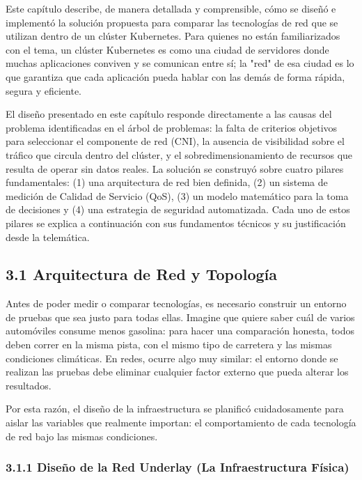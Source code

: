 \documentclass[journal]{IEEEtran}
\begin{document}
Este capítulo describe, de manera detallada y comprensible, cómo se diseñó e implementó la solución propuesta para comparar las tecnologías de red que se utilizan dentro de un clúster Kubernetes. Para quienes no están familiarizados con el tema, un clúster Kubernetes es como una ciudad de servidores donde muchas aplicaciones conviven y se comunican entre sí; la "red" de esa ciudad es lo que garantiza que cada aplicación pueda hablar con las demás de forma rápida, segura y eficiente.

El diseño presentado en este capítulo responde directamente a las causas del problema identificadas en el árbol de problemas: la falta de criterios objetivos para seleccionar el componente de red (CNI), la ausencia de visibilidad sobre el tráfico que circula dentro del clúster, y el sobredimensionamiento de recursos que resulta de operar sin datos reales. La solución se construyó sobre cuatro pilares fundamentales: (1) una arquitectura de red bien definida, (2) un sistema de medición de Calidad de Servicio (QoS), (3) un modelo matemático para la toma de decisiones y (4) una estrategia de seguridad automatizada. Cada uno de estos pilares se explica a continuación con sus fundamentos técnicos y su justificación desde la telemática.

\subsection{3.1 Arquitectura de Red y Topología}

Antes de poder medir o comparar tecnologías, es necesario construir un entorno de pruebas que sea justo para todas ellas. Imagine que quiere saber cuál de varios automóviles consume menos gasolina: para hacer una comparación honesta, todos deben correr en la misma pista, con el mismo tipo de carretera y las mismas condiciones climáticas. En redes, ocurre algo muy similar: el entorno donde se realizan las pruebas debe eliminar cualquier factor externo que pueda alterar los resultados.

Por esta razón, el diseño de la infraestructura se planificó cuidadosamente para aislar las variables que realmente importan: el comportamiento de cada tecnología de red bajo las mismas condiciones.

\subsubsection{3.1.1 Diseño de la Red Underlay (La Infraestructura Física)}
\end{document}
